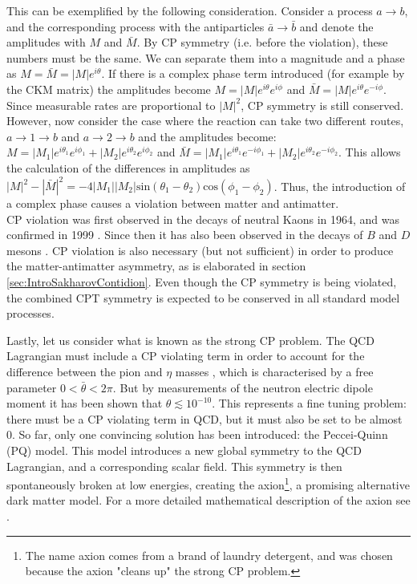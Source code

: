 This can be exemplified by the following consideration. Consider a process $a \rightarrow b$, and the corresponding process with the antiparticles $\bar{a} \rightarrow \bar{b}$ and denote the amplitudes with $M$ and $\bar{M}$. By CP symmetry (i.e. before the violation), these numbers must be the same. We can separate them into a magnitude and a phase as $M = \bar{M} = |M|e^{i\theta}$. If there is a complex phase term introduced (for example by the CKM matrix) the amplitudes become $M = |M|e^{i\theta}e^{i\phi}$ and $\bar{M} = |M|e^{i\theta}e^{-i\phi}$. Since measurable rates are proportional to $|M|^2$, CP symmetry is still conserved. However, now consider the case where the reaction can take two different routes, $a \rightarrow 1 \rightarrow b$ and $a \rightarrow 2 \rightarrow b$ and the amplitudes become: $M = |M_1|e^{i\theta_1}e^{i\phi_1} + |M_2|e^{i\theta_2}e^{i\phi_2}$ and $\bar{M} = |M_1|e^{i\theta_1}e^{-i\phi_1} + |M_2|e^{i\theta_2}e^{-i\phi_2}$. This allows the calculation of the differences in amplitudes as $|M|^2 - |\bar{M}|^2 = -4|M_1||M_2|\mathrm{sin}(\theta_1 - \theta_2)\mathrm{cos}(\phi_1 - \phi_2)$. Thus, the introduction of a complex phase causes a violation between matter and antimatter. \\
CP violation was first observed in the decays of neutral Kaons\cite{CP_violations_early} in 1964, and was confirmed in 1999 \cite{CP_violations_proof}. Since then it has also been observed in the decays of $B$ and $D$ mesons \cite{CP_violation_B, CP_violation_D}. CP violation is also necessary (but not sufficient) in order to produce the matter-antimatter asymmetry, as is elaborated in section \ref{sec:IntroSakharovContidion}. Even though the CP symmetry is being violated, the combined CPT symmetry is expected to be conserved in all standard model processes\cite{}. 

Lastly, let us consider what is known as the strong CP problem. The QCD Lagrangian must include a CP violating term in order to account for the difference between the pion and $\eta$ masses \cite{tHooft}, which is characterised by a free parameter $0<\bar{\theta}<2\pi$. But by measurements of the neutron electric dipole moment it has been shown that $\theta \lesssim 10^{-10}$. This represents a fine tuning problem: there must be a CP violating term in QCD, but it must also be set to be almost 0. So far, only one convincing solution has been introduced: the Peccei-Quinn (PQ) model. This model introduces a new global symmetry to the QCD Lagrangian, and a corresponding scalar field. This symmetry is then spontaneously broken at low energies, creating the axion\footnote{The name axion comes from a brand of laundry detergent, and was chosen because the axion "cleans up" the strong CP problem.}, a promising alternative dark matter model. For a more detailed mathematical description of the axion see \cite{axion_review}.


